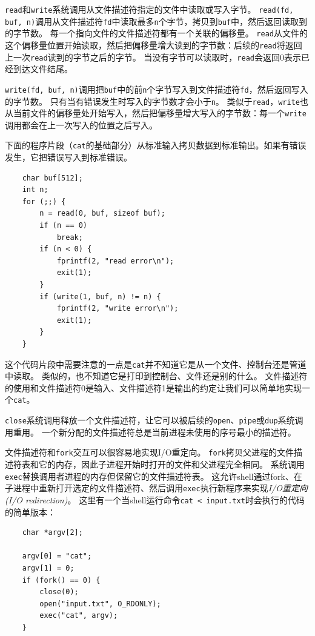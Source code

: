 \texttt{read}和\texttt{write}系统调用从文件描述符指定的文件中读取或写入字节。
\texttt{read(fd, buf, n)}调用从文件描述符\texttt{fd}中读取最多\texttt{n}个字节，拷贝到\texttt{buf}中，然后返回读取到的字节数。
每一个指向文件的文件描述符都有一个关联的偏移量。
\texttt{read}从文件的这个偏移量位置开始读取，然后把偏移量增大读到的字节数：后续的\texttt{read}将返回上一次\texttt{read}读到的字节之后的字节。
当没有字节可以读取时，\texttt{read}会返回0表示已经到达文件结尾。

\texttt{write(fd, buf, n)}调用把\texttt{buf}中的前\texttt{n}个字节写入到文件描述符\texttt{fd}，然后返回写入的字节数。
只有当有错误发生时写入的字节数才会小于\texttt{n}。
类似于\texttt{read}，\texttt{write}也从当前文件的偏移量处开始写入，然后把偏移量增大写入的字节数：每一个\texttt{write}调用都会在上一次写入的位置之后写入。

下面的程序片段（\texttt{cat}的基础部分）从标准输入拷贝数据到标准输出。如果有错误发生，它把错误写入到标准错误。
\begin{lstlisting}
    char buf[512];
    int n;
    for (;;) {
        n = read(0, buf, sizeof buf);
        if (n == 0)
            break;
        if (n < 0) {
            fprintf(2, "read error\n");
            exit(1);
        }
        if (write(1, buf, n) != n) {
            fprintf(2, "write error\n");
            exit(1);
        }
    }
\end{lstlisting}

这个代码片段中需要注意的一点是\texttt{cat}并不知道它是从一个文件、控制台还是管道中读取。
类似的，也不知道它是打印到控制台、文件还是别的什么。
文件描述符的使用和文件描述符0是输入、文件描述符1是输出的约定让我们可以简单地实现一个\texttt{cat}。

\texttt{close}系统调用释放一个文件描述符，让它可以被后续的\texttt{open}、\texttt{pipe}或\texttt{dup}系统调用重用。
一个新分配的文件描述符总是当前进程未使用的序号最小的描述符。

文件描述符和\texttt{fork}交互可以很容易地实现I/O重定向。
\texttt{fork}拷贝父进程的文件描述符表和它的内存，因此子进程开始时打开的文件和父进程完全相同。
系统调用\texttt{exec}替换调用者进程的内存但保留它的文件描述符表。
这允许shell通过fork、在子进程中重新打开选定的文件描述符、然后调用\texttt{exec}执行新程序来实现\emph{I/O重定向(I/O redirection)}。
这里有一个当shell运行命令\texttt{cat < input.txt}时会执行的代码的简单版本：

\begin{lstlisting}
    char *argv[2];

    argv[0] = "cat";
    argv[1] = 0;
    if (fork() == 0) {
        close(0);
        open("input.txt", O_RDONLY);
        exec("cat", argv);
    }
\end{lstlisting}

